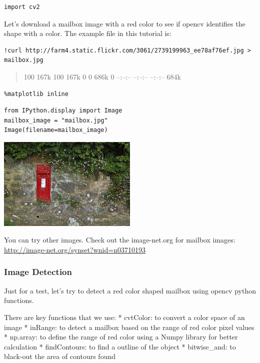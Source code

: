 \begin{lstlisting}
import cv2
\end{lstlisting}

Let's download a mailbox image with a red color to see if opencv
identifies the shape with a color. The example file in this tutorial is:

\begin{lstlisting}
!curl http://farm4.static.flickr.com/3061/2739199963_ee78af76ef.jpg > mailbox.jpg
\end{lstlisting}

\begin{quote}
100 167k 100 167k 0 0 686k 0 --:--:-- --:--:-- --:--:-- 684k
\end{quote}

\begin{lstlisting}
%matplotlib inline
\end{lstlisting}

\begin{lstlisting}
from IPython.display import Image
mailbox_image = "mailbox.jpg"
Image(filename=mailbox_image)
\end{lstlisting}

\includegraphics[width=0.5\textwidth]{facedetection_files/facedetection_46_0.jpeg}

You can try other images. Check out the image-net.org for mailbox
images: \url{http://image-net.org/synset?wnid=n03710193}

\subsubsection{Image Detection}\label{image-detection}

Just for a test, let's try to detect a red color shaped mailbox using
opencv python functions.

There are key functions that we use: * cvtColor: to convert a color
space of an image * inRange: to detect a mailbox based on the range of
red color pixel values * np.array: to define the range of red color
using a Numpy library for better calculation * findContours: to find a
outline of the object * bitwise\_and: to black-out the area of contours
found

